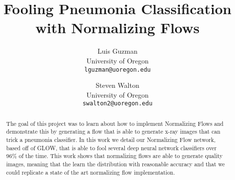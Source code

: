 \documentclass[10pt,twocolumn,letterpaper]{article}
\begin{document}
\title{Fooling Pneumonia Classification with Normalizing Flows}

\author{Luis Guzman\\
University of Oregon\\
{\tt\small lguzman@uoregon.edu}
\and
Steven Walton\\
University of Oregon\\
{\tt\small swalton2@uoregon.edu}
}

\maketitle

\begin{abstract} 
    The goal of this project was to learn about how to implement
    Normalizing Flows and demonstrate this by generating a flow that is able to
    generate x-ray images that can trick a pneumonia classifier.  In this work
    we detail our Normalizing Flow network, based off of GLOW, that is able to
    fool several deep neural network classifiers over 96\% of the time.  This
    work shows that normalizing flows are able to generate quality images,
    meaning that the learn the distribution with reasonable accuracy and that we
    could replicate a state of the art normalizing flow implementation. 
\end{abstract}







{\small


}
\end{document}
